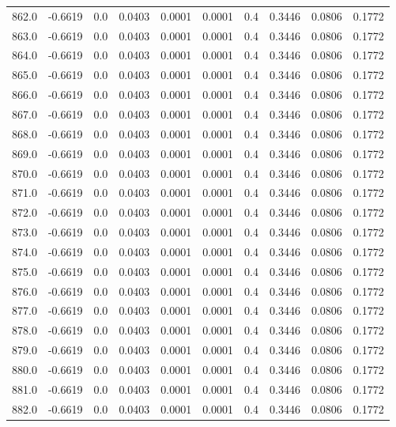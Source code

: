 \begin{longtable}{lrrrrrrrrr}
862.0 & -0.6619 & 0.0 & 0.0403 & 0.0001 & 0.0001 & 0.4 & 0.3446 & 0.0806 & 0.1772 \\
863.0 & -0.6619 & 0.0 & 0.0403 & 0.0001 & 0.0001 & 0.4 & 0.3446 & 0.0806 & 0.1772 \\
864.0 & -0.6619 & 0.0 & 0.0403 & 0.0001 & 0.0001 & 0.4 & 0.3446 & 0.0806 & 0.1772 \\
865.0 & -0.6619 & 0.0 & 0.0403 & 0.0001 & 0.0001 & 0.4 & 0.3446 & 0.0806 & 0.1772 \\
866.0 & -0.6619 & 0.0 & 0.0403 & 0.0001 & 0.0001 & 0.4 & 0.3446 & 0.0806 & 0.1772 \\
867.0 & -0.6619 & 0.0 & 0.0403 & 0.0001 & 0.0001 & 0.4 & 0.3446 & 0.0806 & 0.1772 \\
868.0 & -0.6619 & 0.0 & 0.0403 & 0.0001 & 0.0001 & 0.4 & 0.3446 & 0.0806 & 0.1772 \\
869.0 & -0.6619 & 0.0 & 0.0403 & 0.0001 & 0.0001 & 0.4 & 0.3446 & 0.0806 & 0.1772 \\
870.0 & -0.6619 & 0.0 & 0.0403 & 0.0001 & 0.0001 & 0.4 & 0.3446 & 0.0806 & 0.1772 \\
871.0 & -0.6619 & 0.0 & 0.0403 & 0.0001 & 0.0001 & 0.4 & 0.3446 & 0.0806 & 0.1772 \\
872.0 & -0.6619 & 0.0 & 0.0403 & 0.0001 & 0.0001 & 0.4 & 0.3446 & 0.0806 & 0.1772 \\
873.0 & -0.6619 & 0.0 & 0.0403 & 0.0001 & 0.0001 & 0.4 & 0.3446 & 0.0806 & 0.1772 \\
874.0 & -0.6619 & 0.0 & 0.0403 & 0.0001 & 0.0001 & 0.4 & 0.3446 & 0.0806 & 0.1772 \\
875.0 & -0.6619 & 0.0 & 0.0403 & 0.0001 & 0.0001 & 0.4 & 0.3446 & 0.0806 & 0.1772 \\
876.0 & -0.6619 & 0.0 & 0.0403 & 0.0001 & 0.0001 & 0.4 & 0.3446 & 0.0806 & 0.1772 \\
877.0 & -0.6619 & 0.0 & 0.0403 & 0.0001 & 0.0001 & 0.4 & 0.3446 & 0.0806 & 0.1772 \\
878.0 & -0.6619 & 0.0 & 0.0403 & 0.0001 & 0.0001 & 0.4 & 0.3446 & 0.0806 & 0.1772 \\
879.0 & -0.6619 & 0.0 & 0.0403 & 0.0001 & 0.0001 & 0.4 & 0.3446 & 0.0806 & 0.1772 \\
880.0 & -0.6619 & 0.0 & 0.0403 & 0.0001 & 0.0001 & 0.4 & 0.3446 & 0.0806 & 0.1772 \\
881.0 & -0.6619 & 0.0 & 0.0403 & 0.0001 & 0.0001 & 0.4 & 0.3446 & 0.0806 & 0.1772 \\
882.0 & -0.6619 & 0.0 & 0.0403 & 0.0001 & 0.0001 & 0.4 & 0.3446 & 0.0806 & 0.1772 \\

\end{longtable}
